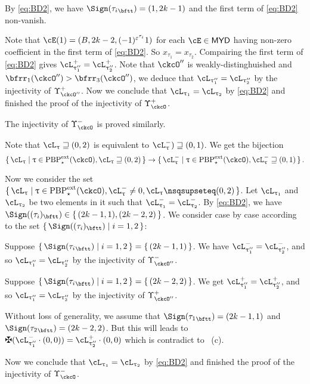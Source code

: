 \documentclass[12pt,a4paper]{amsart}
\def\MYD{{\mathsf{MYD}}}
\numberwithin{equation}{section}
\theoremstyle{remark}
\def\PBPes{\mathrm{PBP}^{\mathrm{ext}}_{\star}}
\def\uptaupp{\uptau^{\prime\prime}}
\begin{document}
  By \eqref{eq:BD2}, we have $\Sign(\ttail{\tau_{i}}) = (1,2k-1)$ and the first term of \eqref{eq:BD2} non-vanish.

    Note that $\cE(1) = (B,2k-2,(-1)^{\varepsilon^{\tau_{i}}}1)$ for each $\cE\in \MYD$ having non-zero
    coefficient in the first term of \eqref{eq:BD2}. So $x_{\tau_{1}}=x_{\tau_{2}}$.
    Compairing the first term of \eqref{eq:BD2} gives $\pac{\uptaupp_{1}}=\pac{\uptaupp_{2}}$.
    Note that $\ckcO''$ is weakly-distinghuished and $\bfrr_{1}(\ckcO'')>\bfrr_{3}(\ckcO'')$, we deduce that
    $\ac_{\uptaupp_{1}}=\ac_{\uptaupp_{2}}$ by the injectivity of $\Upsilon_{\ckcO''}^{+}$.
    Now we conclude that $\ac_{ \uptau_{1} }=\ac_{ \uptau_{2} }$ by \eqref{eq:BD2} and
    finished the proof of the injectivity of $\Upsilon_{\ckcO}^{+}$.

    \smallskip

    The injectivity of $\Upsilon_{\ckcO}^{-}$ is proved similarly.

  Note that $\ac_{\uptau}\sqsupseteq (0,2)$ is equivalent to
  $\nac{\uptau})\sqsupseteq (0,1)$.
  We get the bijection
  \[
    \set{\ac_{\uptau}|\uptau\in \PBPes(\ckcO),\ac_{\uptau}\sqsupseteq (0,2)} \rightarrow
    \set{\nac{\uptau}|\uptau\in \PBPes(\ckcO),\nac{\uptau}\sqsupseteq (0,1)}.
  \]

  Now we consider the set
  $\set{\ac_{\uptau}|\uptau\in \PBPes(\ckcO),\nac{\uptau}\neq 0, \ac_{\uptau}\nsqsupseteq (0,2)}$.
  Let $\ac_{\uptau_{1}}$ and $\ac_{\uptau_{2}}$ be two elements in it such that
  $\nac{\uptau_{1}}=\nac{\uptau_{2}}$.
  By \eqref{eq:BD2}, we have $\Sign((\tau_{i})_{\bftt}) \in \set{ (2k-1,1),(2k-2,2)}$.
  We consider case by case according to the set $\set{\Sign((\tau_{i})_{\bftt})|i=1,2}$:
  \begin{enumPF}
    \item Suppose
    $\set{\Sign({\tau_{i}}_{\bftt})|i=1,2} = \set{(2k-1,1)}$.
    We have $\nac{\uptau''_{1}} = \nac{\uptau''_{2}}$, and so
    $\ac_{\uptaupp_{1}}=\ac_{\uptaupp_{2}}$ by the injectivity of $\Upsilon_{\ckcO''}^{-}$.
    \item Suppose
    $\set{\Sign({\tau_{i}}_{\bftt})|i=1,2} = \set{(2k-2,2)}$. We get
    $\pac{\uptau''_{1}} = \pac{\uptau''_{2}}$, and so
    $\ac_{\uptaupp_{1}}=\ac_{\uptaupp_{2}}$ by the injectivity of $\Upsilon_{\ckcO''}^{+}$.
    \item
    Without loss of generality, we assume that
    $\Sign({\tau_{1}}_{\bftt}) = (2k-1,1)$ and
    $\Sign({\tau_{2}}_{\bftt}) = (2k-2,2)$.
    But this will leads to
    $\maltese (\nac{\uptau''_{1}}\cdot (0,0)) = \pac{\uptau''_{2}}\cdot (0,0)$
    which is contradict to ~(c).
  \end{enumPF}
  Now we conclude that $\ac_{ \uptau_{1} }=\ac_{ \uptau_{2} }$ by \eqref{eq:BD2} and
  finished the proof of the injectivity of $\Upsilon_{\ckcO}^{-}$.
\end{document}
